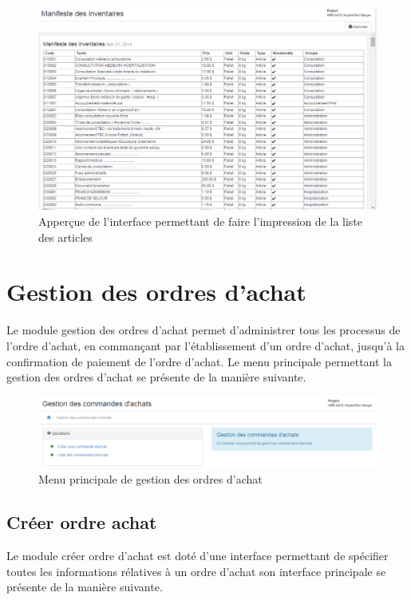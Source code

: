 \documentclass[12pt,a4paper]{report}
\begin{document}
\begin{figure}[h]
\begin{center}
\includegraphics[width=14cm]{pic/manifInventaire.png}
\end{center}
\caption{Apperçue de l'interface permettant de faire l'impression de la liste des articles}
\label{Apperçue de l'interface permettant de faire l'impression de la liste des articles}
\end{figure}

\newpage
\section{Gestion des ordres d'achat}
Le module gestion des ordres d'achat permet d'administrer tous les processus de l'ordre d'achat, en commançant par l'établissement d'un ordre d'achat, jusqu'à la confirmation de paiement de l'ordre d'achat. Le menu principale permettant la gestion des ordres d'achat se présente de la manière suivante.

\begin{figure}[h]
\begin{center}
\includegraphics[width=14cm]{pic/GestOrdAchat.png}
\end{center}
\caption{Menu principale de gestion des ordres d'achat}
\label{Menu principale de gestion des ordres d'achat}
\end{figure}

\subsection{Créer ordre achat}
Le module créer ordre d'achat est doté d'une interface permettant de spécifier toutes les informations rélatives à un ordre d'achat son interface principale se présente de la manière suivante.
\end{document}

